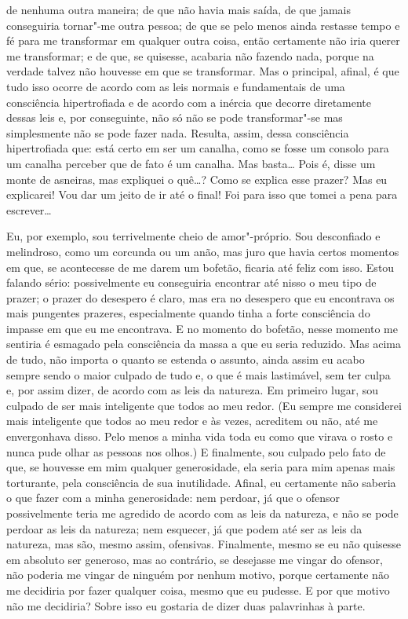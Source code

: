 de nenhuma outra maneira; de que não havia mais saída, de que jamais
conseguiria tornar"-me outra pessoa; de que se pelo menos ainda restasse
tempo e fé para me transformar em qualquer outra coisa, então
certamente não iria querer me transformar; e de que, se quisesse,
acabaria não fazendo nada, porque na verdade talvez não houvesse em que
se transformar. Mas o principal, afinal, é que tudo isso ocorre de
acordo com as leis normais e fundamentais de uma consciência
hipertrofiada e de acordo com a inércia que decorre diretamente dessas
leis e, por conseguinte, não só não se pode transformar"-se mas
simplesmente não se pode fazer nada. Resulta, assim, dessa consciência
hipertrofiada que: está certo em ser um canalha, como se fosse um
consolo para um canalha perceber que de fato é um canalha. Mas basta\ldots{}
Pois é, disse um monte de asneiras, mas expliquei o quê\ldots{}? Como se
explica esse prazer? Mas eu explicarei! Vou dar um jeito de ir até o
final! Foi para isso que tomei a pena para escrever\ldots{}

Eu, por exemplo, sou terrivelmente cheio de amor"-próprio. Sou
desconfiado e melindroso, como um corcunda ou um anão, mas juro que
havia certos momentos em que, se acontecesse de me darem um bofetão,
ficaria até feliz com isso. Estou falando sério: possivelmente eu
conseguiria encontrar até nisso o meu tipo de prazer; o prazer do
desespero é claro, mas era no desespero que eu encontrava os mais
pungentes prazeres, especialmente quando tinha a forte consciência do
impasse em que eu me encontrava. E no momento do bofetão, nesse momento
me sentiria é esmagado pela consciência da massa a que eu seria
reduzido. Mas acima de tudo, não importa o quanto se estenda o assunto,
ainda assim eu acabo sempre sendo o maior culpado de tudo e, o que é
mais lastimável, sem ter culpa e, por assim dizer, de acordo com as
leis da natureza. Em primeiro lugar, sou culpado de ser mais
inteligente que todos ao meu redor. (Eu sempre me considerei mais
inteligente que todos ao meu redor e às vezes, acreditem ou não, até me
envergonhava disso. Pelo menos a minha vida toda eu como que virava o
rosto e nunca pude olhar as pessoas nos olhos.) E finalmente, sou
culpado pelo fato de que, se houvesse em mim qualquer generosidade, ela
seria para mim apenas mais torturante, pela consciência de sua
inutilidade. Afinal, eu certamente não saberia o que fazer com a minha
generosidade: nem perdoar, já que o ofensor possivelmente teria me
agredido de acordo com as leis da natureza, e não se pode perdoar as
leis da natureza; nem esquecer, já que podem até ser as leis da
natureza, mas são, mesmo assim, ofensivas. Finalmente, mesmo se eu
não quisesse em absoluto ser generoso, mas ao contrário, se desejasse
me vingar do ofensor, não poderia me vingar de ninguém por nenhum
motivo, porque certamente não me decidiria por fazer qualquer coisa,
mesmo que eu pudesse. E por que motivo não me decidiria? Sobre isso eu
gostaria de dizer duas palavrinhas à parte.


